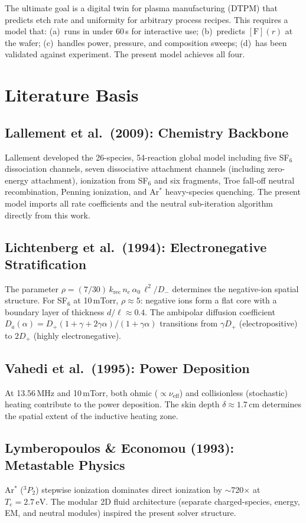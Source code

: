 \documentclass[11pt,a4paper]{article}
\renewcommand{\ne}{n_e}
\newcommand{\Te}{T_e}
\newcommand{\Da}{D_a}
\newcommand{\eV}{\,\mathrm{eV}}
\begin{document}
The ultimate goal is a digital twin for plasma manufacturing (DTPM) that predicts etch rate and uniformity for arbitrary process recipes.  This requires a model that: (a)~runs in under 60\,s for interactive use; (b)~predicts $[\mathrm{F}](r)$ at the wafer; (c)~handles power, pressure, and composition sweeps; (d)~has been validated against experiment.  The present model achieves all four.

\section{Literature Basis}
\label{sec:lit}

\subsection{Lallement et al.\ (2009): Chemistry Backbone}
Lallement developed the 26-species, 54-reaction global model including five SF$_6$ dissociation channels, seven dissociative attachment channels (including zero-energy attachment), ionization from SF$_6$ and six fragments, Troe fall-off neutral recombination, Penning ionization, and Ar$^*$ heavy-species quenching.  The present model imports all rate coefficients and the neutral sub-iteration algorithm directly from this work.

\subsection{Lichtenberg et al.\ (1994): Electronegative Stratification}
The parameter $\rho = (7/30)\,k_{\mathrm{rec}}\,\ne\,\alpha_0\,\ell^2/D_-$ determines the negative-ion spatial structure.  For SF$_6$ at 10\,mTorr, $\rho \approx 5$: negative ions form a flat core with a boundary layer of thickness $d/\ell \approx 0.4$.  The ambipolar diffusion coefficient $\Da(\alpha) = D_+(1+\gamma+2\gamma\alpha)/(1+\gamma\alpha)$ transitions from $\gamma D_+$ (electropositive) to $2D_+$ (highly electronegative).

\subsection{Vahedi et al.\ (1995): Power Deposition}
At 13.56\,MHz and 10\,mTorr, both ohmic ($\propto \nu_{\mathrm{eff}}$) and collisionless (stochastic) heating contribute to the power deposition.  The skin depth $\delta \approx 1.7$\,cm determines the spatial extent of the inductive heating zone.

\subsection{Lymberopoulos \& Economou (1993): Metastable Physics}
Ar$^*$ ($^3P_2$) stepwise ionization dominates direct ionization by $\sim$720$\times$ at $\Te = 2.7\eV$.  The modular 2D fluid architecture (separate charged-species, energy, EM, and neutral modules) inspired the present solver structure.
\end{document}
